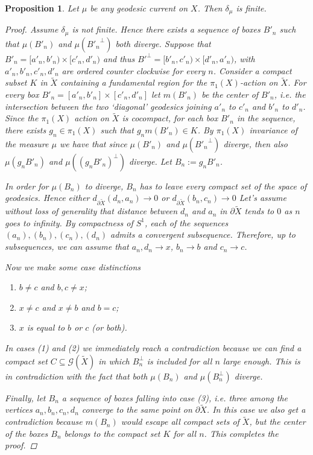 \documentclass[12pt,article]{amsart}
\numberwithin{equation}{section}
\numberwithin{figure}{section}
\newtheorem{proposition}[equation]{Proposition}
\theoremstyle{definition}
\theoremstyle{plain}
\newcommand*{\wt}[1]{\widetilde{#1}}
\begin{document}
\begin{proposition}
Let $\mu$ be any geodesic current on $X$. Then $\delta_{\mu}$ is finite.
\label{prop:deltafinite}


\begin{proof}
  Assume $\delta_{\mu}$ is not finite. Hence there exists a sequence of boxes $B'_n$ such that $\mu(B'_n)$ and $\mu({B'_n}^{\perp})$ both diverge. Suppose that
  $B'_n = [a'_n, b'_n) \times [c'_n,d'_n)$ and thus $B'^{\perp}=[b'_n, c'_n) \times [d'_n, a'_n)$, with $a'_n, b'_n, c'_n, d'_n$ are ordered counter clockwise for every $n$. Consider a compact subset $K$ in $\wt{X}$ containing a fundamental region for the $\pi_1 (X)$-action on $\wt{X}$.
For every box $B'_n = [a'_n , b'_n] \times [c'_n , d'_n]$ let $m(B'_n)$ be the \emph{center} of $B'_n$, i.e. the intersection between the two `diagonal' geodesics joining $a'_n$ to $c'_n$ and $b'_n$ to $d'_n$. 
Since the $\pi_1 (X)$ action on $\wt{X}$ is cocompact,  for each box $B'_n$ in the sequence, there exists $g_n \in \pi_1 (X)$ such that $g_n  m(B'_n) \in K$. By $\pi_1 (X)$ invariance of the measure $\mu$ we have that since $\mu (B'_n)$ and $\mu ({B'_n} ^\perp)$ diverge, then also $\mu (g_n B'_n )$ and $\mu ( (g_n {B'_n} )^\perp)$ diverge. Let $B_n := g_n B'_n$.

  In order for $\mu(B_n)$ to diverge, $B_n$ has to leave every compact set of the space of geodesics. Hence either $d_{\partial \wt{X}} (d_n , a_n) \to 0$ or $d_{\partial \wt{X}} (b_n , c_n) \to 0$
  Let's assume without loss of generality that distance between $d_n$ and $a_n$ in $\partial \wt{X}$ tends to $0$ as $n$ goes to infinity.
   By compactness of $S^1$, each of the sequences $(a_n), (b_n), (c_n), (d_n)$ admits a convergent subsequence. Therefore, up to subsequences, we can assume that
   $a_n, d_n \to x$, $b_n \to b$ and $c_n \to c$.

   
 Now we make some case distinctions
  \begin{enumerate}
      \item $b \neq c$ and $b,c  \neq x$;
      \item  $x \neq c$ and $x \neq b$ and $b = c$;
      \item $x$ is equal to $b$ or $c$ (or both).
  \end{enumerate}
  In cases (1) and (2) we immediately reach a contradiction because we can find a compact set $C \subseteq \mathcal{G} (\wt{X})$ in which $B_n ^\perp$ is included for all $n$ large enough. This is in contradiction with the fact that both $\mu (B_n)$ and $\mu (B_n ^\perp)$ diverge.

Finally, let $B_n$ a sequence of boxes falling into case (3), i.e. three among the vertices $a_n, b_n, c_n, d_n$ converge to the same point on $\partial \wt{X}$.
In this case we also get a contradiction because $m(B_n)$ would escape all compact sets of $\wt{X}$, but the center of the boxes $B _n$  belongs to the compact set $K$ for all $n$. This completes the proof.


\end{proof}
\end{proposition}
\end{document}
